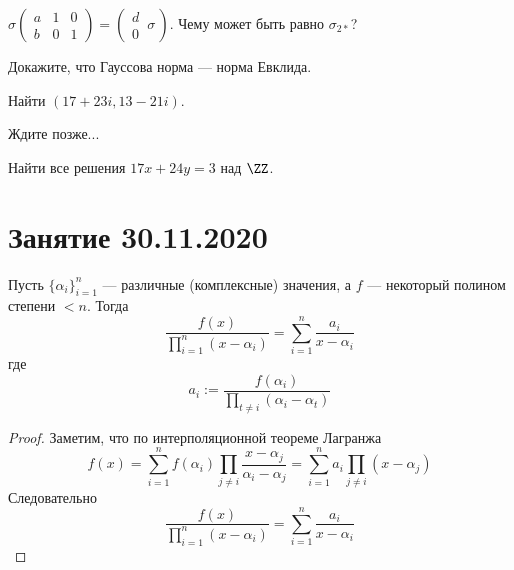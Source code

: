 \documentclass[12pt,a4paper]{article}
\begin{document}
    \begin{exercise}
        $\sigma \left(\begin{smallmatrix}
            a & 1 & 0\\ b & 0 & 1
        \end{smallmatrix}\right) = \left(\begin{smallmatrix}
            d \\ 0
        \end{smallmatrix}\,\sigma\,\right)$. Чему может быть равно $\sigma_{2*}$?
    \end{exercise}

    \begin{exercise}
        Докажите, что Гауссова норма --- норма Евклида.
    \end{exercise}

    \begin{exercise}
        Найти $(17 + 23i, 13 - 21i)$.
    \end{exercise}

    \begin{exercise}
        Ждите позже...
    \end{exercise}

    \begin{exercise}
        Найти все решения $17 x + 24 y = 3$ над $\ZZ$.
    \end{exercise}

    \newpage
    \section{Занятие 30.11.2020}

    \begin{lemma}
        Пусть $\{\alpha_i\}_{i=1}^n$ --- различные (комплексные) значения, а $f$ --- некоторый полином степени $< n$. Тогда
        \[\frac{f(x)}{\prod_{i=1}^n (x - \alpha_i)} = \sum_{i=1}^n \frac{a_i}{x-\alpha_i}\]
        где
        \[a_i := \frac{f(\alpha_i)}{\prod_{t \neq i} (\alpha_i - \alpha_t)}\] 
    \end{lemma}

    \begin{proof}
        Заметим, что по интерполяционной теореме Лагранжа
        \[
            f(x)
            = \sum_{i=1}^n f(\alpha_i) \prod_{j \neq i} \frac{x - \alpha_j}{\alpha_i - \alpha_j}
            = \sum_{i=1}^n a_i \prod_{j \neq i} (x - \alpha_j)
        \]
        Следовательно
        \[\frac{f(x)}{\prod_{i=1}^n (x - \alpha_i)} = \sum_{i=1}^n \frac{a_i}{x-\alpha_i}\]
    \end{proof}
\end{document}
